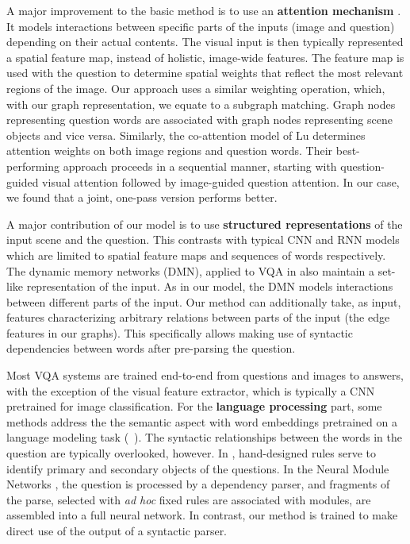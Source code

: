 A major improvement to the basic method is to use an \textbf{attention mechanism} \cite{zhu2015visual7w,xu2015ask,Chen2015ABC,Jiang2015compositional,andreas2015deep,yang2015stacked}. It models interactions between specific parts of the inputs (image and question) depending on their actual contents. The visual input is then typically represented a spatial feature map, instead of holistic, image-wide features. The feature map is used with the question to determine spatial weights that reflect the most relevant regions of the image. Our approach uses a similar weighting operation, which, with our graph representation, we equate to a subgraph matching. Graph nodes representing question words are associated with graph nodes representing scene objects and vice versa. Similarly, the co-attention model of Lu \etal \cite{lu2016hierarchical} determines attention weights on both image regions and question words. Their best-performing approach proceeds in a sequential manner, starting with question-guided visual attention followed by image-guided question attention. In our case, we found that a joint, one-pass version performs better.

A major contribution of our model is to use \textbf{structured representations} of the input scene and the question. This contrasts with typical CNN and RNN models which are limited to spatial feature maps and sequences of words respectively. The dynamic memory networks (DMN), applied to VQA in \cite{xiong2016} also maintain a set-like representation of the input. As in our model, the DMN models interactions between different parts of the input. Our method can additionally take, as input, features characterizing  arbitrary relations between parts of the input (the edge features in our graphs). This specifically allows making use of syntactic dependencies between words after pre-parsing the question.

Most VQA systems are trained end-to-end from questions and images to answers, with the exception of the visual feature extractor, which is typically a CNN pretrained for image classification. For the \textbf{language processing} part, some methods address the the semantic aspect with word embeddings pretrained on a language modeling task (\eg~\cite{shih2015look,fukui2016multimodal}). The syntactic relationships between the words in the question are typically overlooked, however. In \cite{zhang2015balanced}, hand-designed rules serve to identify primary and secondary objects of the questions. In the Neural Module Networks \cite{andreas2015deep,andreas2016learning}, the question is processed by a dependency parser, and fragments of the parse, selected with \textit{ad hoc} fixed rules are associated with modules, are assembled into a full neural network. In contrast, our method is trained to make direct use of the output of a syntactic parser.

